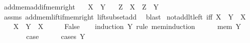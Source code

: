 \begin{isabellebody}
\endisatagproof
{\isafoldproof}%
%
\isadelimproof
\isanewline
%
\endisadelimproof
\isanewline
{}\isamarkupfalse%
\ add{\isacharunderscore}{\kern0pt}mem{\isacharunderscore}{\kern0pt}add{\isacharunderscore}{\kern0pt}if{\isacharunderscore}{\kern0pt}mem{\isacharunderscore}{\kern0pt}right{\isacharcolon}{\kern0pt}\isanewline
\ \ \ {\isachardoublequoteopen}X\ {\isasymin}\ Y{\isachardoublequoteclose}\isanewline
\ \ \ {\isachardoublequoteopen}Z\ {\isacharplus}{\kern0pt}\ X\ {\isasymin}\ Z\ {\isacharplus}{\kern0pt}\ Y{\isachardoublequoteclose}\isanewline
%
\isadelimproof
\ \ %
\endisadelimproof
%
\isatagproof
{}\isamarkupfalse%
\ assms\ add{\isacharunderscore}{\kern0pt}mem{\isacharunderscore}{\kern0pt}lift{\isacharunderscore}{\kern0pt}if{\isacharunderscore}{\kern0pt}mem{\isacharunderscore}{\kern0pt}right\ lift{\isacharunderscore}{\kern0pt}subset{\isacharunderscore}{\kern0pt}add\ \isamarkupfalse%
\ blast%
\endisatagproof
{\isafoldproof}%
%
\isadelimproof
\isanewline
%
\endisadelimproof
\isanewline
{}\isamarkupfalse%
\ not{\isacharunderscore}{\kern0pt}add{\isacharunderscore}{\kern0pt}lt{\isacharunderscore}{\kern0pt}left\ {\isacharbrackleft}{\kern0pt}iff{\isacharbrackright}{\kern0pt}{\isacharcolon}{\kern0pt}\ {\isachardoublequoteopen}{\isasymnot}{\isacharparenleft}{\kern0pt}X\ {\isacharplus}{\kern0pt}\ Y\ {\isacharless}{\kern0pt}\ X{\isacharparenright}{\kern0pt}{\isachardoublequoteclose}\isanewline
%
\isadelimproof
%
\endisadelimproof
%
\isatagproof
{}\isamarkupfalse%
\isanewline
\ \ \isamarkupfalse%
\ {\isachardoublequoteopen}X\ {\isacharplus}{\kern0pt}\ Y\ {\isacharless}{\kern0pt}\ X{\isachardoublequoteclose}\isanewline
\ \ \isamarkupfalse%
\ \isamarkupfalse%
\ {\isachardoublequoteopen}False{\isachardoublequoteclose}\isanewline
\ \ \isamarkupfalse%
\ {\isacharparenleft}{\kern0pt}induction\ Y\ rule{\isacharcolon}{\kern0pt}\ mem{\isacharunderscore}{\kern0pt}induction{\isacharparenright}{\kern0pt}\isanewline
\ \ \ \ \isamarkupfalse%
\ {\isacharparenleft}{\kern0pt}mem\ Y{\isacharparenright}{\kern0pt}\isanewline
\ \ \ \ \isamarkupfalse%
\ \isamarkupfalse%
\ {\isacharquery}{\kern0pt}case\isanewline
\ \ \ \ \isamarkupfalse%
\ {\isacharparenleft}{\kern0pt}cases\ {\isachardoublequoteopen}Y\ {\isacharequal}{\kern0pt}\ {\isacharbraceleft}{\kern0pt}{\isacharbraceright}{\kern0pt}{\isachardoublequoteclose}{\isacharparenright}{\kern0pt}\isanewline

\end{isabellebody}
